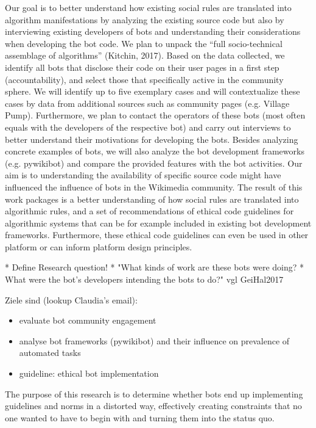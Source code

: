 \documentclass[pdftex,a4paper,11pt]{scrartcl}
\begin{document}
Our goal is to better understand how existing social rules are 
translated into algorithm manifestations by analyzing the existing 
source code but also by interviewing existing developers of bots and 
understanding their considerations when developing the bot code. We plan 
to unpack the “full socio-technical assemblage of algorithms” (Kitchin, 
2017). Based on the data collected, we identify all bots that disclose 
their code on their user pages in a first step (accountability), and 
select those that specifically active in the community sphere. We will 
identify up to five exemplary cases and will contextualize these cases 
by data from additional sources such as community pages (e.g. Village 
Pump). Furthermore, we plan to contact the operators of these bots (most 
often equals with the developers of the respective bot) and carry out 
interviews to better understand their motivations for developing the 
bots. Besides analyzing concrete examples of bots, we will also analyze 
the bot development frameworks (e.g. pywikibot) and compare the provided 
features with the bot activities. Our aim is to understanding the 
availability of specific source code might have influenced the influence 
of bots in the Wikimedia community. The result of this work packages is 
a better understanding of how social rules are translated into 
algorithmic rules, and a set of recommendations of ethical code 
guidelines for algorithmic systems that can be for example included in 
existing bot development frameworks. Furthermore, these ethical code 
guidelines can even be used in other platform or can inform platform 
design principles.

* Define Research question!
  * "What kinds of work are these bots were doing?
  * What were the bot’s developers intending the bots to do?" vgl GeiHal2017
\begin{comment}
\begin{itemize}
	\item Die Ziele sollten so spezifisch wie möglich sein. Das hilft Ihnen im Verlauf der Umsetzung zu prüfen, ob Sie Ihre Ziele erreichen konnten. Bitte achten Sie darauf, dass die gesetzten Ziele realistisch sind und das Sie in der Lage sind, das erfolgreiche Erreichen dieser Ziele im Bereich Evaluation zu prüfen.
\end{itemize}
\end{comment}


Ziele sind (lookup Claudia's email):
\begin{itemize}
    \item evaluate bot community engagement
    \item analyse bot frameworks (pywikibot) and their influence on prevalence of automated tasks
    \item guideline: ethical bot implementation

\end{itemize}
The purpose of this research is to determine whether bots end up implementing guidelines and norms in a distorted way, effectively creating constraints that no one wanted to have to begin with and turning them into the status quo.
\end{document}
